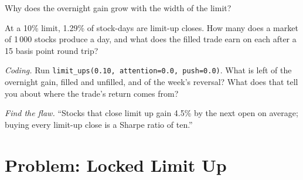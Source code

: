 \begin{exercise}[$\star\star$]\label{exo:s1:asia-specific-equity-strategies:5}
Why does the overnight gain grow with the width of the limit?
\end{exercise}

\begin{exercise}[$\star\star$]\label{exo:s1:asia-specific-equity-strategies:6}
At a 10\% limit, 1.29\% of stock-days are limit-up closes. How many does a market of 1\,000 stocks produce a day, and what does the filled trade earn on
each after a 15 basis point round trip?
\end{exercise}

\begin{exercise}[$\star\star\star$]\label{exo:s1:asia-specific-equity-strategies:7}
\emph{Coding.} Run \texttt{limit\_ups(0.10, attention=0.0, push=0.0)}. What is left of the overnight gain, filled and unfilled, and of the week's
reversal? What does that tell you about where the trade's return comes from?
\end{exercise}

\begin{exercise}[$\star\star\star$]\label{exo:s1:asia-specific-equity-strategies:8}
\emph{Find the flaw.} ``Stocks that close limit up gain 4.5\% by the next open on average; buying every limit-up close is a Sharpe ratio of ten.''
\end{exercise}

\section{Problem: Locked Limit Up}

